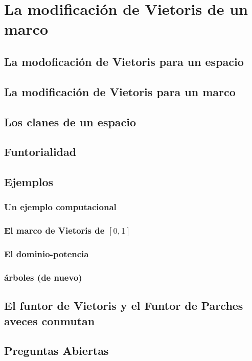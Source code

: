 \chapter{La modificación de Vietoris de un marco}
\section{La modoficación de Vietoris para un espacio}
\section{La modificación de Vietoris para un marco}
\section{Los clanes de un espacio}
\section{Funtorialidad}
\section{Ejemplos}
\subsection{Un ejemplo computacional}
\subsection{El marco de Vietoris de $[0,1]$}
\subsection{El dominio-potencia}
\subsection{árboles (de nuevo)}
\section{El funtor de Vietoris y el Funtor de Parches aveces conmutan}
\section{Preguntas Abiertas}
